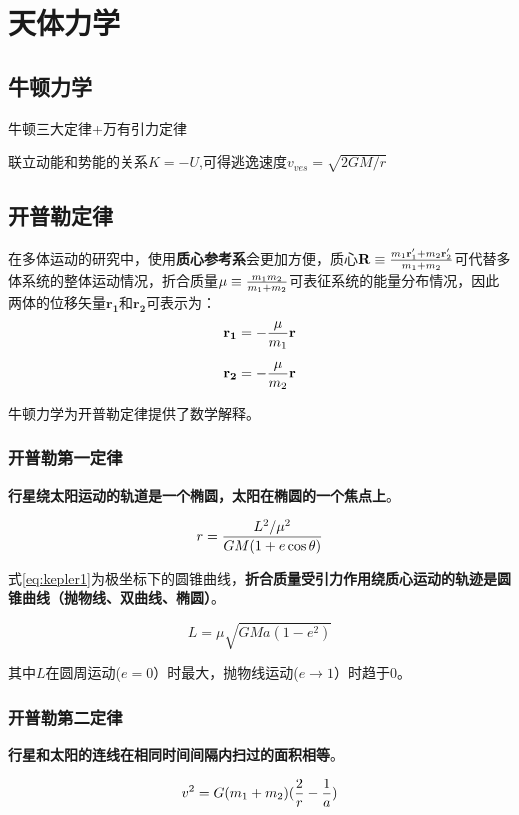 \chapter{天体力学}
\section{牛顿力学}
牛顿三大定律+万有引力定律

联立动能和势能的关系$K=-U$,可得逃逸速度$v_{ves}=\sqrt{2GM/r}$

\section{开普勒定律}
在多体运动的研究中，使用{\bf 质心参考系}会更加方便，质心$\mathbf{R}\equiv {m_1 \mathbf{r}'_1+m_2
\mathbf{r}'_2 \over m_1+m_2} $可代替多体系统的整体运动情况，折合质量$\mu \equiv {m_1m_2 \over m_1
+m_2}$可表征系统的能量分布情况，因此两体的位移矢量$\mathbf{r_1}$和$\mathbf{r_2}$可表示为：
\begin{align}\label{eq:r}
  \mathbf{r_1} &=-{\mu\over m_1}\mathbf r\\[2mm]
  \mathbf{r_2} &=-{\mu\over m_2}\mathbf r
\end{align}

牛顿力学为开普勒定律提供了数学解释。
\subsection{开普勒第一定律}
{\bf 行星绕太阳运动的轨道是一个椭圆，太阳在椭圆的一个焦点上}。

\begin{equation}
  r={L^2/\mu^2 \over GM(1+e\cos\theta)}
  \label{eq:kepler1}
\end{equation}

式\ref{eq:kepler1}为极坐标下的圆锥曲线，{\bf 折合质量受引力作用绕质心运动的轨迹是圆锥曲线（抛物线、双曲线、椭圆）}。

\begin{equation}
  L=\mu\sqrt{GMa(1-e^2)}
\end{equation}

其中$L$在圆周运动($e=0$）时最大，抛物线运动($e\rightarrow 1$）时趋于0。

\subsection{开普勒第二定律}
{\bf 行星和太阳的连线在相同时间间隔内扫过的面积相等}。

\begin{equation}
  v^2=G(m_1+m_2)({2\over r}-{1\over a})
  \label{eq:kepler2}
\end{equation}


